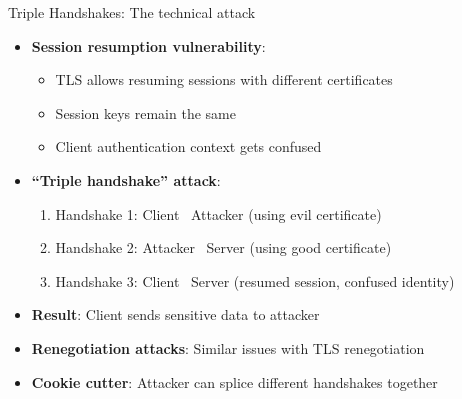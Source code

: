 \documentclass[aspectratio=169, lualatex, handout]{beamer}
\begin{document}
\begin{frame}{Triple Handshakes: The technical attack}
	\begin{itemize}[<+->]
		\item \textbf{Session resumption vulnerability}:
		      \begin{itemize}
			      \item TLS allows resuming sessions with different certificates
			      \item Session keys remain the same
			      \item Client authentication context gets confused
		      \end{itemize}
		\item \textbf{``Triple handshake'' attack}:
		      \begin{enumerate}
			      \item Handshake 1: Client \leftarrow\ Attacker (using evil certificate)
			      \item Handshake 2: Attacker \leftarrow\ Server (using good certificate)
			      \item Handshake 3: Client \leftarrow\ Server (resumed session, confused identity)
		      \end{enumerate}
		\item \textbf{Result}: Client sends sensitive data to attacker
		\item \textbf{Renegotiation attacks}: Similar issues with TLS renegotiation
		\item \textbf{Cookie cutter}: Attacker can splice different handshakes together
	\end{itemize}
\end{frame}
\end{document}
